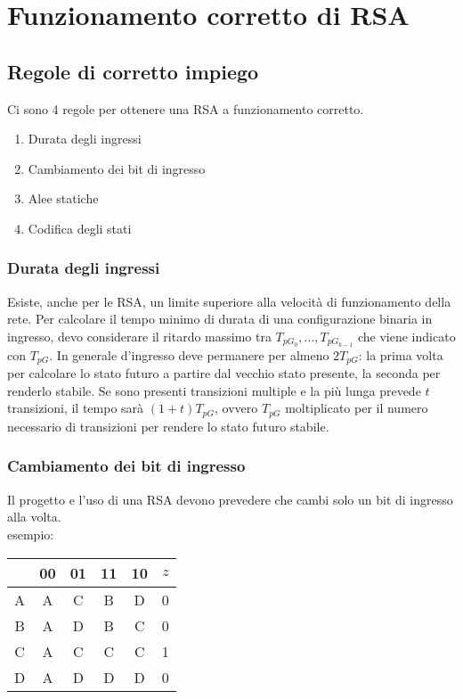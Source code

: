 \documentclass{subfiles}
\begin{document}
\section{Funzionamento corretto di RSA}

\subsection{Regole di corretto impiego}

Ci sono 4 regole per ottenere una RSA a funzionamento corretto.

\begin{enumerate}
    \item Durata degli ingressi
    \item Cambiamento dei bit di ingresso
    \item Alee statiche
    \item Codifica degli stati
\end{enumerate}

\subsubsection{Durata degli ingressi}

Esiste, anche per le RSA, un limite superiore alla velocità di funzionamento della rete.
Per calcolare il tempo minimo di durata di una configurazione binaria in ingresso, devo considerare il ritardo massimo tra $T_{pG_0}, \dots, T_{pG_{k-1}}$ che viene indicato con $T_{pG}$.
In generale d'ingresso deve permanere per almeno $2T_{pG}$: la prima volta per calcolare lo stato futuro a partire dal vecchio stato presente, la seconda per renderlo stabile.
Se sono presenti transizioni multiple e la più lunga prevede $t$ transizioni, il tempo sarà $(1 + t)T_{pG}$, ovvero $T_{pG}$ moltiplicato per il numero necessario di transizioni per rendere lo stato futuro stabile.

\subsubsection{Cambiamento dei bit di ingresso}

Il progetto e l'uso di una RSA devono prevedere che cambi solo un bit di ingresso alla volta.\\

\noindent
esempio:

\begin{center}
\begin{tabular}{ |c|c|c|c|c|c| }
\hline
& 00 & 01 & 11 & 10 & $z$ \\
\hline
\hline
A & A & C & B & D & 0 \\
B & A & D & B & C & 0 \\
C & A & C & C & C & 1 \\
D & A & D & D & D & 0 \\
\hline
\end{tabular}
\end{center}
\end{document}
